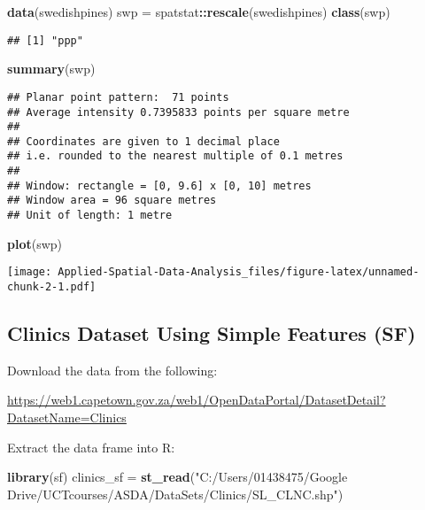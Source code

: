 \documentclass[
]{book}
\newenvironment{Shaded}{\begin{snugshade}}{\end{snugshade}}
\newcommand{\KeywordTok}[1]{\textcolor[rgb]{0.13,0.29,0.53}{\textbf{#1}}}
\newcommand{\NormalTok}[1]{#1}
\newcommand{\OperatorTok}[1]{\textcolor[rgb]{0.81,0.36,0.00}{\textbf{#1}}}
\newcommand{\StringTok}[1]{\textcolor[rgb]{0.31,0.60,0.02}{#1}}
\begin{document}
\begin{Shaded}
\begin{Highlighting}[]
\KeywordTok{data}\NormalTok{(swedishpines)}
\NormalTok{swp =}\StringTok{ }\NormalTok{spatstat}\OperatorTok{::}\KeywordTok{rescale}\NormalTok{(swedishpines)}
\KeywordTok{class}\NormalTok{(swp)}
\end{Highlighting}
\end{Shaded}

\begin{verbatim}
## [1] "ppp"
\end{verbatim}

\begin{Shaded}
\begin{Highlighting}[]
\KeywordTok{summary}\NormalTok{(swp)}
\end{Highlighting}
\end{Shaded}

\begin{verbatim}
## Planar point pattern:  71 points
## Average intensity 0.7395833 points per square metre
## 
## Coordinates are given to 1 decimal place
## i.e. rounded to the nearest multiple of 0.1 metres
## 
## Window: rectangle = [0, 9.6] x [0, 10] metres
## Window area = 96 square metres
## Unit of length: 1 metre
\end{verbatim}

\begin{Shaded}
\begin{Highlighting}[]
\KeywordTok{plot}\NormalTok{(swp)}
\end{Highlighting}
\end{Shaded}

\texttt{[image: Applied-Spatial-Data-Analysis\_files/figure-latex/unnamed-chunk-2-1.pdf]}

\hypertarget{clinics-dataset-using-simple-features-sf}{%
\subsection{Clinics Dataset Using Simple Features (SF)}\label{clinics-dataset-using-simple-features-sf}}

Download the data from the following:

\url{https://web1.capetown.gov.za/web1/OpenDataPortal/DatasetDetail?DatasetName=Clinics}

Extract the data frame into R:

\begin{Shaded}
\begin{Highlighting}[]
\KeywordTok{library}\NormalTok{(sf)}
\NormalTok{clinics_sf =}\StringTok{ }\KeywordTok{st_read}\NormalTok{(}\StringTok{"C:/Users/01438475/Google Drive/UCTcourses/ASDA/DataSets/Clinics/SL_CLNC.shp"}\NormalTok{)}
\end{Highlighting}
\end{Shaded}
\end{document}
